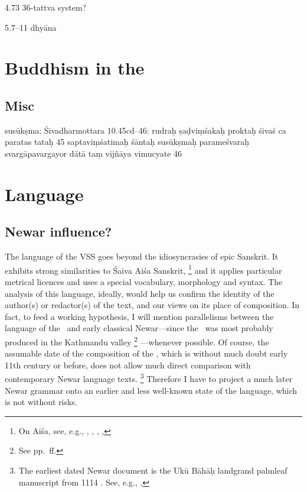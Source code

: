 4.73 36-tattva system?

5.7--11 dhyāna

\section{Buddhism in the \VSS}


\subsection{Misc}

  susūkṣma: Śivadharmottara 10.45cd--46: rudraḥ ṣaḍviṃśakaḥ proktaḥ
  śivaś ca paratas tataḥ \textbar{}\textbar{} 45 \textbar{}\textbar{}
  saptaviṃśatimaḥ śāntaḥ susūkṣmaḥ parameśvaraḥ \textbar{}
  svargāpavargayor dātā taṃ vijñāya vimucyate \textbar{}\textbar{} 
  46
  







\section{Language}\label{language}

\subsection{Newar influence?}
\label{newar}

The language of the VSS goes beyond the idiosyncrasies of epic Sanskrit.
It exhibits strong similarities to Śaiva Aiśa Sanskrit,%
		\footnote{On Aiśa, see, e.g., , 
								  ,
						          , 
						          , 
						          } 
and it applies particular metrical licences and 
uses a special vocabulary, morphology and syntax.
The analysis of this language, ideally, would help us
confirm the identity of the author(s) or redactor(s) of the text, 
and our views on its place of composition. In fact, 
to feed a working hypothesis, I will mention parallelisms
between the language of the \VSS\ and early classical 
Newar---since the \VSS\ was most probably produced in the 
Kathmandu valley%
		\footnote{See pp.~\pageref{provenance}\thinspace ff.}%
---whenever possible. 
Of course, the assumable date
of the composition of the \VSS, which is without much doubt
early 11th century or before, does not allow much direct 
comparison with contemporary Newar language texts.%
	\footnote{The earliest dated Newar document is 
			the Ukū Bāhāḥ landgrand palmleaf manuscript from
			1114 \CE. See, e.g., .}
Therefore I have to project a much later Newar grammar
onto an earlier and less well-known 
state of the language, which is not without risks.

